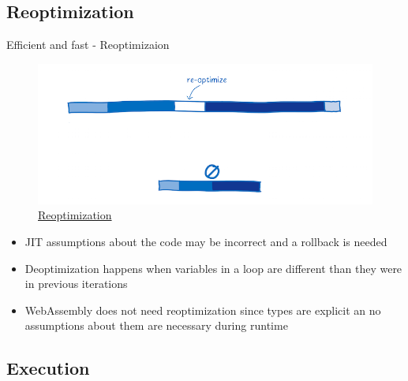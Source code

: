 \documentclass{beamer}
\begin{document}
\subsection{Reoptimization}

\begin{frame}{Efficient and fast - Reoptimizaion}
    \begin{figure}
        \includegraphics[scale=0.2]{./images/re-optimize.png}
        \caption{\href{https://www.smashingmagazine.com/2017/05/abridged-cartoon-introduction-webassembly/}{Reoptimization}}
    \end{figure}
    \begin{itemize}
        \item JIT assumptions about the code may be incorrect and a rollback is needed
        \item Deoptimization happens when variables in a loop are different than they were in previous iterations
        \item WebAssembly does not need reoptimization since types are explicit an no assumptions about them are necessary during runtime
    \end{itemize}
\end{frame}

\subsection{Execution}
\end{document}
